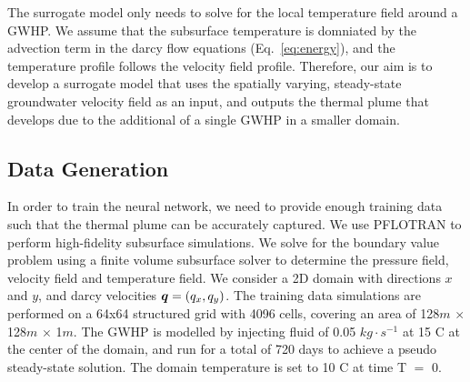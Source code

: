 \documentclass{article} %
\begin{document}
The surrogate model only needs to solve for the local temperature field around a GWHP. 
We assume that the subsurface temperature is domniated by the advection term in the darcy flow equations (Eq.~\ref{eq:energy}), and the temperature profile follows the velocity field profile. 
Therefore, our aim is to develop a surrogate model that uses the spatially varying, steady-state groundwater velocity field as an input, and outputs the thermal plume that develops due to the additional of a single GWHP in a smaller domain. 


\subsection*{Data Generation}


In order to train the neural network, we need to provide enough training data such that the thermal plume can be accurately captured. We use PFLOTRAN \citep{pflotran-paper} to perform high-fidelity subsurface simulations.
We solve for the boundary value problem using a finite volume subsurface solver to determine the pressure field, velocity field and temperature field.
We consider a 2D domain with directions $x$ and $y$, and darcy velocities ${\bm{q}} = (q_x, q_y)$.
The training data simulations are performed on a 64x64 structured grid with 4096 cells, covering an area of 128$m$ $\times$ 128$m$ $\times$ 1$m$. The GWHP is modelled by injecting fluid of 0.05 $kg \cdot s^{-1}$ at 15 \degree C at the center of the domain, and run for a total of 720 days to achieve a pseudo steady-state solution. The domain temperature is set to 10 \degree C at time T $=$ 0.
\end{document}
